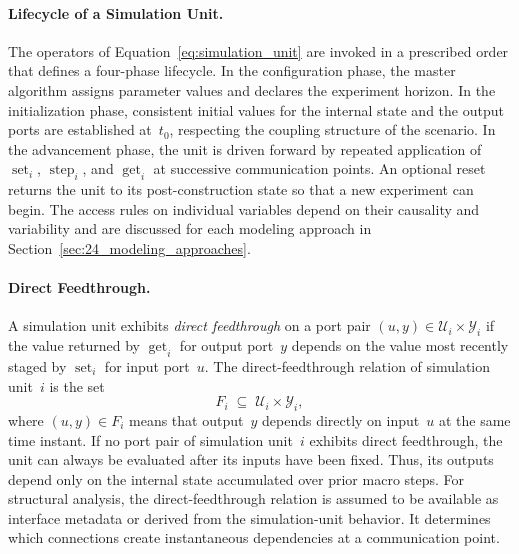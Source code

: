 \paragraph{Lifecycle of a Simulation Unit.}
\label{para:simulation_unit_lifecycle}
The operators of Equation~\eqref{eq:simulation_unit} are invoked in a prescribed order that defines a four-phase lifecycle.
In the configuration phase, the master algorithm assigns parameter values and declares the experiment horizon.
In the initialization phase, consistent initial values for the internal state and the output ports are established at~$t_0$, respecting the coupling structure of the scenario.
In the advancement phase, the unit is driven forward by repeated application of $\operatorname{set}_i$, $\operatorname{step}_i$, and $\operatorname{get}_i$ at successive communication points.
An optional reset returns the unit to its post-construction state so that a new experiment can begin.
The access rules on individual variables depend on their causality and variability and are discussed for each modeling approach in Section~\ref{sec:24_modeling_approaches}.

\paragraph{Direct Feedthrough.}
A simulation unit exhibits \emph{direct feedthrough} on a port pair $(u, y) \in \mathcal{U}_i \times \mathcal{Y}_i$ if the value returned by $\operatorname{get}_i$ for output port~$y$ depends on the value most recently staged by $\operatorname{set}_i$ for input port~$u$.
The direct-feedthrough relation of simulation unit~$i$ is the set
\begin{equation}
    F_i \;\subseteq\; \mathcal{U}_i \times \mathcal{Y}_i,
    \label{eq:feedthrough_relation}
\end{equation}
where $(u, y) \in F_i$ means that output~$y$ depends directly on input~$u$ at the same time instant.
If no port pair of simulation unit~$i$ exhibits direct feedthrough, the unit can always be evaluated after its inputs have been fixed.
Thus, its outputs depend only on the internal state accumulated over prior macro steps.
For structural analysis, the direct-feedthrough relation is assumed to be available as interface metadata or derived from the simulation-unit behavior.
It determines which connections create instantaneous dependencies at a communication point.

